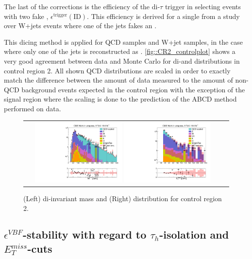 The last of the corrections is the efficiency of the di-$\tau$ trigger in selecting events with two fake \hadtau , $\epsilon^{\text{trigger}}(\text{ID})$. This efficiency is derived for a single \hadtaufake from a study over W+jets events where one of the jets fakes an \hadtau.

This dicing method is applied for QCD samples and W+jet samples, in the case where only one of the jets is reconstructed as \hadtaufake. \autoref{fig::CR2_controlplot} shows a very good agreement between data and Monte Carlo for di-\hadtau and \met distributions in control region 2. All shown QCD distributions are scaled in order to exactly match the difference between the amount of data measured to the amount of non-QCD background events expected in the control region with the exception of the signal region where the scaling is done to the prediction of the ABCD method performed on data.


\begin{figure}[tbh!]
	\centering
	\begin{tabular}{cc}
		\includegraphics[width=0.45\textwidth]{PLOTS/diTauHadLSQCDPlots/AllMCdiced/OS_CR2/OS_Central_invertedVBF_2TightIso_CR2/h_ditauinvariantmass_log.pdf}
		\includegraphics[width=0.45\textwidth]{PLOTS/diTauHadLSQCDPlots/AllMCdiced/OS_CR2/OS_Central_invertedVBF_2TightIso_CR2/h_met_log.pdf} 		
	\end{tabular}
	\caption{(Left) di-\hadtau invariant mass and (Right) \met distribution for control region 2.}
	\label{fig::CR2_controlplots}
\end{figure}

\subsection{$\epsilon^{VBF}$-stability with regard to $\tau_{h}$-isolation and $E_{T}^{miss}$-cuts}
\label{dihad:subsec:stability}

